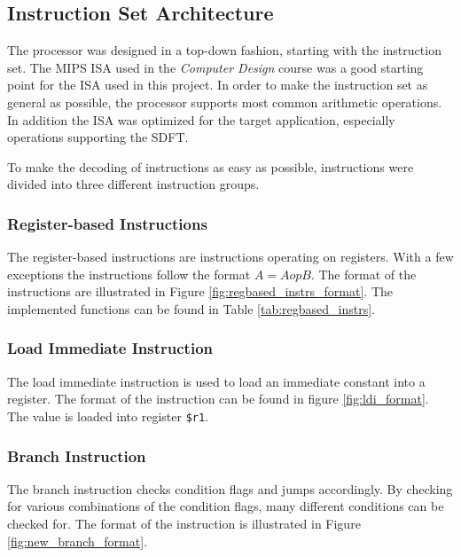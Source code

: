 \subsection{Instruction Set Architecture}\label{section:fpga-isa}

The processor was designed in a top-down fashion, starting with the instruction
set. The MIPS ISA used in the \textit{Computer
Design}\cite{tdt4255} course was a good starting point for the ISA used in this
project. In order to make the instruction set as general as possible, the 
processor supports most common arithmetic operations. In addition the ISA was
optimized for the target application, especially operations supporting the SDFT.

To make the decoding of instructions as easy as possible, instructions
were divided into three different instruction groups.

\subsubsection{Register-based Instructions}

The register-based instructions are instructions operating on registers. With a
few exceptions the instructions follow the format $A = A op B$. The format of the
instructions are illustrated in Figure \ref{fig:regbased_instrs_format}. The
implemented functions can be found in Table \ref{tab:regbased_instrs}.


\FloatBarrier

\FloatBarrier

\subsubsection{Load Immediate Instruction}
The load immediate instruction is used to load an immediate constant into a
register. The format of the instruction can be found in figure
\ref{fig:ldi_format}. The value is loaded into register \texttt{\$r1}.


\FloatBarrier

\subsubsection{Branch Instruction}
The branch instruction checks condition flags and jumps accordingly. By
checking for various combinations of the condition flags, many different
conditions can be checked for. The format of the instruction is illustrated
in Figure \ref{fig:new_branch_format}.

